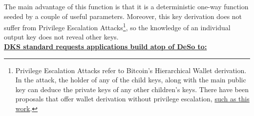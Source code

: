 \documentclass[oneside, 12pt]{article}
\newcommand{\fn}[1]{\footnote{\hangpara{1.4em}{1} #1}}
\begin{document}
\noindent The main advantage of this function is that it is a deterministic one-way function seeded by a couple of useful parameters. Moreover, this key derivation does not suffer from Privilege Escalation Attacks\fn{Privilege Escalation Attacks refer to Bitcoin’s Hierarchical Wallet derivation. In the attack, the holder of any of the child keys, along with the main public key can deduce the private keys of any other children’s keys. There have been proposals that offer wallet derivation without privilege escalation, \href{https://ieeexplore.ieee.org/document/8625151}{such as this work}.}, so the knowledge of an individual output key does not reveal other keys.\\

\noindent\underline{\textbf{DKS standard requests applications build atop of DeSo to:}}
\end{document}
